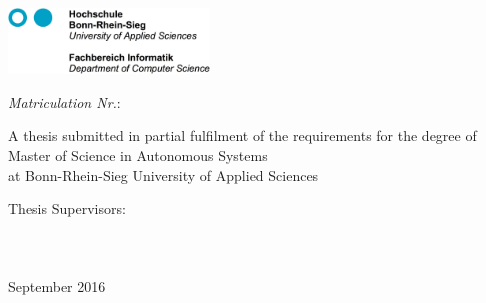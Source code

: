 \begin{titlepage}
\raggedright
\includegraphics[width=0.4\textwidth]{pictures/FH-Header.jpg}\\
\centering
\vspace*{1in}
\begin{Large}\bfseries
\PaperSubject \par
\end{Large}
\vspace{1.2in}
\begin{LARGE}\bfseries
 \par
\end{LARGE}
\begin{LARGE}
\PaperMainWriter%
 \par
\end{LARGE}
\vspace{0.15in}
\begin{small}
\emph{Matriculation Nr.}: \MatID %
 \par
\end{small}

\vspace{0.5in}
A thesis submitted in partial fulfilment of the requirements for the degree of
Master of Science in Autonomous Systems \\
at Bonn-Rhein-Sieg University of Applied Sciences
\vfill
\vspace{0.5in}
\par
\vfill
Thesis Supervisors:\\
\ThesisReferee \\ %
\ThesisExReferee \\ %
\ThesisAdvisor \\
\vspace{0.4in} %
September 2016

\end{titlepage}




